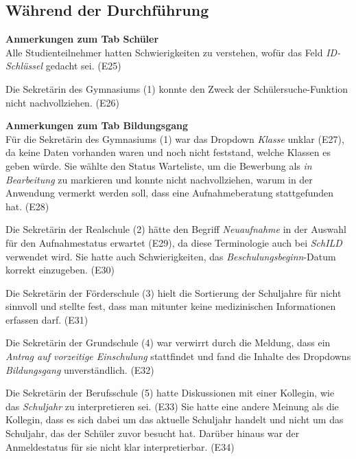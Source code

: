 \subsection{Während der Durchführung}

\textbf{Anmerkungen zum Tab \glqq Schüler\grqq{}}\\  
Alle Studienteilnehmer hatten Schwierigkeiten zu verstehen, wofür das Feld \textit{ID-Schlüssel} gedacht sei. (E25)

Die Sekretärin des Gymnasiums (1) konnte den Zweck der Schülersuche-Funktion nicht nachvollziehen. (E26)


\textbf{Anmerkungen zum Tab \glqq Bildungsgang\grqq{}}\\
Für die Sekretärin des Gymnasiums (1) war das Dropdown \textit{Klasse} unklar (E27), da keine Daten vorhanden waren und noch nicht feststand, welche Klassen es geben würde. Sie wählte den Status \glqq Warteliste\grqq{}, um die Bewerbung als \textit{in Bearbeitung} zu markieren und konnte nicht nachvollziehen, warum in der Anwendung vermerkt werden soll, dass eine Aufnahmeberatung stattgefunden hat. (E28)

Die Sekretärin der Realschule (2) hätte den Begriff \textit{Neuaufnahme} in der Auswahl für den Aufnahmestatus erwartet (E29), da diese Terminologie auch bei \textit{SchILD} verwendet wird. Sie hatte auch Schwierigkeiten, das \textit{Beschulungsbeginn}-Datum korrekt einzugeben. (E30)

Die Sekretärin der Förderschule (3) hielt die Sortierung der Schuljahre für nicht sinnvoll und stellte fest, dass man mitunter keine medizinischen Informationen erfassen darf. (E31)

Die Sekretärin der Grundschule (4) war verwirrt durch die Meldung, dass ein \textit{Antrag auf vorzeitige Einschulung} stattfindet und fand die Inhalte des Dropdowns \textit{Bildungsgang} unverständlich. (E32)

Die Sekretärin der Berufsschule (5) hatte Diskussionen mit einer Kollegin, wie das \textit{Schuljahr} zu interpretieren sei. (E33) Sie hatte eine andere Meinung als die Kollegin, dass es sich dabei um das aktuelle Schuljahr handelt und nicht um das Schuljahr, das der Schüler zuvor besucht hat. Darüber hinaus war der Anmeldestatus für sie nicht klar interpretierbar. (E34)

